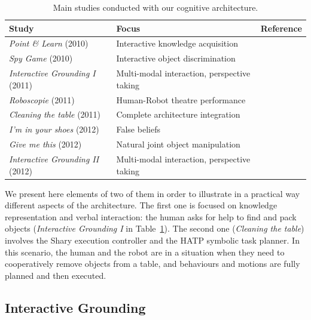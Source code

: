\documentclass[preprint,3p,times]{elsarticle}
\begin{document}
\begin{table}
\begin{center}

\begin{tabular}{lll}
 \bf{Study} & Focus & Reference \\
\hline
{\it Point \& Learn} (2010) & Interactive knowledge acquisition & \cite{Lemaignan2010} \\
{\it Spy Game} (2010) & Interactive object discrimination & \cite{Ros2010b} \\
{\it Interactive Grounding I} (2011) & Multi-modal interaction, perspective taking & \cite{lemaignan2011what} \\
{\it Roboscopie} (2011) & Human-Robot theatre performance & \cite{lemaignan2012roboscopie} \\
{\it Cleaning the table} (2011) & Complete architecture integration & \cite{Alami2011} \\
{\it I'm in your shoes} (2012) & False beliefs & \cite{warnier2012when} \\
{\it Give me this} (2012) & Natural joint object manipulation & \cite{gharbi2013natural} \\
{\it Interactive Grounding II} (2012) & Multi-modal interaction, perspective taking & \cite{lemaignan2013talking} \\
\hline

\end{tabular}
\end{center}
\caption{Main studies conducted with our cognitive architecture.}
\label{table|experiments}
\end{table}

We present here elements of two of them in order to illustrate in a practical way
different aspects of the architecture.  The first one is focused on knowledge
representation and verbal interaction: the human asks for help to find and pack
objects ({\it Interactive Grounding I} in Table~\ref{table|experiments}). The
second one ({\it Cleaning the table}) involves the {\sc Shary} execution
controller and the HATP symbolic task planner. In this scenario, the human and
the robot are in a situation when they need to cooperatively remove objects from a table, and behaviours and
motions are fully planned and then executed.

\subsection{Interactive Grounding}
\label{moving-london}
\end{document}
